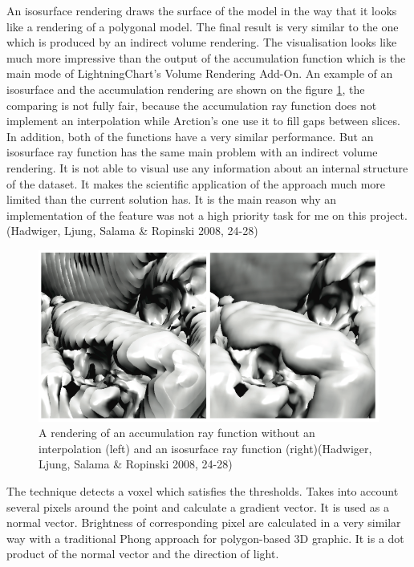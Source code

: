 \documentclass[twoside, english, 11pt]{report}
\begin{document}
An isosurface rendering draws the surface of the model in the way that it looks like a rendering of a polygonal model. The final result is very similar to the one which is produced by an indirect volume rendering. The visualisation looks like much more impressive than the output of the accumulation function which is the main mode of LightningChart's Volume Rendering Add-On. An example of an isosurface and the accumulation rendering are shown on the figure \ref{fig:iso}, the comparing is not fully fair, because the accumulation ray function does not implement an interpolation while Arction's one use it to fill gaps between slices. In addition, both of the functions have a very similar performance. But an isosurface ray function has the same main problem with an indirect volume rendering. It is not able to visual use any information about an internal structure of the dataset. It makes the scientific application of the approach much more limited than the current solution has. It is the main reason why an implementation of the feature was not a high priority task for me on this project.(Hadwiger, Ljung, Salama \& Ropinski 2008, 24-28)
\begin{figure}[H]
\centerline{\includegraphics[scale = 0.5]{img/iso}}
\caption{A rendering of an accumulation ray function without an interpolation (left) and an isosurface ray function (right)(Hadwiger, Ljung, Salama \& Ropinski 2008, 24-28)\label{fig:iso}}
\end{figure}

The technique detects a voxel which satisfies the thresholds. Takes into account several pixels around the point and calculate a gradient vector. It is used as a normal vector. Brightness of corresponding pixel are calculated in a very similar way with a traditional Phong approach for polygon-based 3D graphic. It is a dot product of the normal vector and the direction of light.
\end{document}
